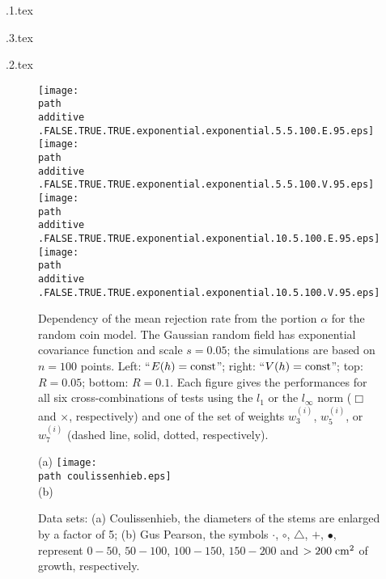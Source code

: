 \documentclass[10pt]{article}
\def\const{\hbox{\rm const}}
\begin{document}
\begin{table}
 \texpath\additive.1.tex 
\end{table}

\begin{table}
 \texpath\variance.3.tex
\end{table}

\begin{table}
 \texpath\nn.2.tex
\end{table}


\def\FigOOO#1{
  \label{fig:#1}
   Dependency of the mean rejection rate from the portion $\alpha$
   for the random coin model.
   The Gaussian random field has
  exponential covariance function and scale $s=0.05$;
  the simulations are based on $n=100$ points.
  Left: ``$E(h)=\const$''; right: ``$V(h)=\const$'';
  top: $R=0.05$; bottom: $R=0.1$.
  Each figure gives the performances for all six cross-combinations of 
  tests using the $l_1$ or the $l_\infty$ norm ($\Box$ and $\times$,
  respectively)
  and one of the set of 
  weights $w^{(i)}_3$,   $w^{(i)}_5$, or $w^{(i)}_7$ (dashed line, solid,
  dotted, respectively).
}
 \begin{figure}
 \begin{center}
  \texttt{[image: \\path\\additive 
    .FALSE.TRUE.TRUE.exponential.exponential.5.5.100.E.95.eps]}
  \texttt{[image: \\path\\additive 
    .FALSE.TRUE.TRUE.exponential.exponential.5.5.100.V.95.eps]}\\[-0mm]
  \texttt{[image: \\path\\additive
    .FALSE.TRUE.TRUE.exponential.exponential.10.5.100.E.95.eps]} 
  \texttt{[image: \\path\\additive
    .FALSE.TRUE.TRUE.exponential.exponential.10.5.100.V.95.eps]}  
 \caption{\FigOOO{simu.E}}
 \end{center}
\end{figure}


\def\FigOOOO#1{Data sets: (a) Coulissenhieb, the diameters of the
 stems are enlarged by a factor of 5; (b) Gus Pearson,
 the symbols \raise -3pt\hbox{\huge $\cdot$}, $\circ$, 
 {\tiny$\bigtriangleup$}, $+$,
 $\bullet$, 
  represent $0-50$, $50-100$, $100-150$, $150-200$ and $>200 {\;\rm
 cm}^2$ of growth, respectively.\label{fig:#1}}
\begin{figure}
(a) \texttt{[image: \\path coulissenhieb.eps]}\\
(b) 
\vspace*{2mm}

\caption{\FigOOOO{data.plot}}
\end{figure}
\end{document}
